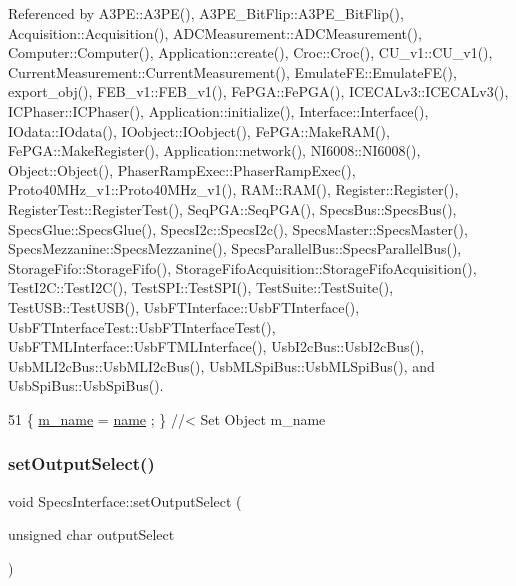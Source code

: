 Referenced by A3\+P\+E\+::\+A3\+P\+E(), A3\+P\+E\+\_\+\+Bit\+Flip\+::\+A3\+P\+E\+\_\+\+Bit\+Flip(), Acquisition\+::\+Acquisition(), A\+D\+C\+Measurement\+::\+A\+D\+C\+Measurement(), Computer\+::\+Computer(), Application\+::create(), Croc\+::\+Croc(), C\+U\+\_\+v1\+::\+C\+U\+\_\+v1(), Current\+Measurement\+::\+Current\+Measurement(), Emulate\+F\+E\+::\+Emulate\+F\+E(), export\+\_\+obj(), F\+E\+B\+\_\+v1\+::\+F\+E\+B\+\_\+v1(), Fe\+P\+G\+A\+::\+Fe\+P\+G\+A(), I\+C\+E\+C\+A\+Lv3\+::\+I\+C\+E\+C\+A\+Lv3(), I\+C\+Phaser\+::\+I\+C\+Phaser(), Application\+::initialize(), Interface\+::\+Interface(), I\+Odata\+::\+I\+Odata(), I\+Oobject\+::\+I\+Oobject(), Fe\+P\+G\+A\+::\+Make\+R\+A\+M(), Fe\+P\+G\+A\+::\+Make\+Register(), Application\+::network(), N\+I6008\+::\+N\+I6008(), Object\+::\+Object(), Phaser\+Ramp\+Exec\+::\+Phaser\+Ramp\+Exec(), Proto40\+M\+Hz\+\_\+v1\+::\+Proto40\+M\+Hz\+\_\+v1(), R\+A\+M\+::\+R\+A\+M(), Register\+::\+Register(), Register\+Test\+::\+Register\+Test(), Seq\+P\+G\+A\+::\+Seq\+P\+G\+A(), Specs\+Bus\+::\+Specs\+Bus(), Specs\+Glue\+::\+Specs\+Glue(), Specs\+I2c\+::\+Specs\+I2c(), Specs\+Master\+::\+Specs\+Master(), Specs\+Mezzanine\+::\+Specs\+Mezzanine(), Specs\+Parallel\+Bus\+::\+Specs\+Parallel\+Bus(), Storage\+Fifo\+::\+Storage\+Fifo(), Storage\+Fifo\+Acquisition\+::\+Storage\+Fifo\+Acquisition(), Test\+I2\+C\+::\+Test\+I2\+C(), Test\+S\+P\+I\+::\+Test\+S\+P\+I(), Test\+Suite\+::\+Test\+Suite(), Test\+U\+S\+B\+::\+Test\+U\+S\+B(), Usb\+F\+T\+Interface\+::\+Usb\+F\+T\+Interface(), Usb\+F\+T\+Interface\+Test\+::\+Usb\+F\+T\+Interface\+Test(), Usb\+F\+T\+M\+L\+Interface\+::\+Usb\+F\+T\+M\+L\+Interface(), Usb\+I2c\+Bus\+::\+Usb\+I2c\+Bus(), Usb\+M\+L\+I2c\+Bus\+::\+Usb\+M\+L\+I2c\+Bus(), Usb\+M\+L\+Spi\+Bus\+::\+Usb\+M\+L\+Spi\+Bus(), and Usb\+Spi\+Bus\+::\+Usb\+Spi\+Bus().


\begin{DoxyCode}
51 \{ \hyperlink{classObject_a8b83c95c705d2c3ba0d081fe1710f48d}{m\_name}  = \hyperlink{classObject_a300f4c05dd468c7bb8b3c968868443c1}{name}  ; \} \textcolor{comment}{//< Set Object m\_name}
\end{DoxyCode}
\mbox{\label{classSpecsInterface_a1907d360f2bda367cfb1d39e379c6493}} 
\subsubsection{\texorpdfstring{set\+Output\+Select()}{setOutputSelect()}}
{\footnotesize\ttfamily void Specs\+Interface\+::set\+Output\+Select (\begin{DoxyParamCaption}\item[{unsigned char}]{output\+Select }\end{DoxyParamCaption})}



